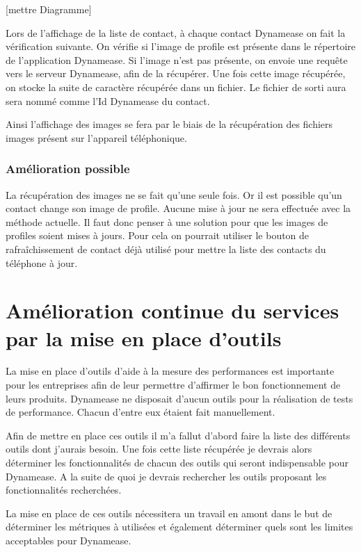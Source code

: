 [mettre Diagramme]

Lors de l'affichage de la liste de contact, à chaque contact Dynamease on fait la vérification suivante. On vérifie si l'image de profile est présente dans le répertoire de l'application Dynamease. Si l'image n'est pas présente, on envoie une requête vers le serveur Dynamease, afin de la récupérer. Une fois cette image récupérée, on stocke la suite de caractère récupérée dans un fichier. Le fichier de sorti aura sera nommé comme l'Id Dynamease du contact.

Ainsi l'affichage des images se fera par le biais de la récupération des fichiers images présent sur l'appareil téléphonique.

\subsubsection{Amélioration possible}

La récupération des images ne se fait qu'une seule fois. Or il est possible qu'un contact change son image de profile. Aucune mise à jour ne sera effectuée avec la méthode actuelle. Il faut donc penser à une solution pour que les images de profiles soient mises à jours. Pour cela on pourrait utiliser le bouton de rafraîchissement de contact déjà utilisé pour mettre la liste des contacts du téléphone à jour. 


\section{Amélioration continue du services par la mise en place d'outils}

La mise en place d'outils d'aide à la mesure des performances est importante pour les entreprises afin de leur permettre d'affirmer le bon fonctionnement de leurs produits. Dynamease ne disposait d'aucun outils pour la réalisation de tests de performance. Chacun d'entre eux étaient fait manuellement.

Afin de mettre en place ces outils il m'a fallut d'abord faire la liste des différents outils dont j'aurais besoin. Une fois cette liste récupérée je devrais alors déterminer les fonctionnalités de chacun des outils qui seront indispensable pour Dynamease. A la suite de quoi je devrais rechercher les outils proposant les fonctionnalités recherchées.

La mise en place de ces outils nécessitera un travail en amont dans le but de déterminer les métriques à utilisées et également déterminer quels sont les limites acceptables pour Dynamease.\\

